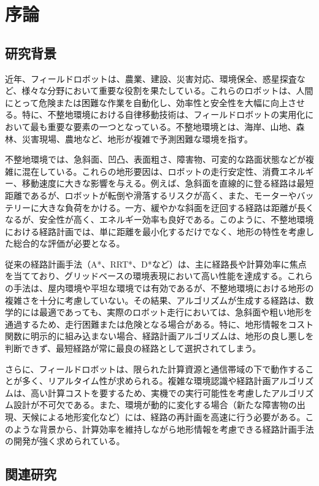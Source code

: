 \chapter{序論}

\section{研究背景}

近年、フィールドロボットは、農業、建設、災害対応、環境保全、惑星探査など、様々な分野において重要な役割を果たしている。これらのロボットは、人間にとって危険または困難な作業を自動化し、効率性と安全性を大幅に向上させる。特に、不整地環境における自律移動技術は、フィールドロボットの実用化において最も重要な要素の一つとなっている。不整地環境とは、海岸、山地、森林、災害現場、農地など、地形が複雑で予測困難な環境を指す。

不整地環境では、急斜面、凹凸、表面粗さ、障害物、可変的な路面状態などが複雑に混在している。これらの地形要因は、ロボットの走行安定性、消費エネルギー、移動速度に大きな影響を与える。例えば、急斜面を直線的に登る経路は最短距離であるが、ロボットが転倒や滑落するリスクが高く、また、モーターやバッテリーに大きな負荷をかける。一方、緩やかな斜面を迂回する経路は距離が長くなるが、安全性が高く、エネルギー効率も良好である。このように、不整地環境における経路計画では、単に距離を最小化するだけでなく、地形の特性を考慮した総合的な評価が必要となる。

従来の経路計画手法（A*、RRT*、D*など）は、主に経路長や計算効率に焦点を当てており、グリッドベースの環境表現において高い性能を達成する。これらの手法は、屋内環境や平坦な環境では有効であるが、不整地環境における地形の複雑さを十分に考慮していない。その結果、アルゴリズムが生成する経路は、数学的には最適であっても、実際のロボット走行においては、急斜面や粗い地形を通過するため、走行困難または危険となる場合がある。特に、地形情報をコスト関数に明示的に組み込まない場合、経路計画アルゴリズムは、地形の良し悪しを判断できず、最短経路が常に最良の経路として選択されてしまう。

さらに、フィールドロボットは、限られた計算資源と通信帯域の下で動作することが多く、リアルタイム性が求められる。複雑な環境認識や経路計画アルゴリズムは、高い計算コストを要するため、実機での実行可能性を考慮したアルゴリズム設計が不可欠である。また、環境が動的に変化する場合（新たな障害物の出現、天候による地形変化など）には、経路の再計画を高速に行う必要がある。このような背景から、計算効率を維持しながら地形情報を考慮できる経路計画手法の開発が強く求められている。

\section{関連研究}

